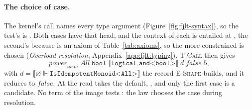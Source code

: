 \paragraph{The choice of case.}
The kernel's call names every type argument (Figure~\ref{fig:fjlt-syntax}), so the test's  is .
Both cases have that head, and the context of each is entailed at , the second's because  is an axiom of Table~\ref{tab:axioms}, so the more constrained is chosen (\emph{Overload resolution}, Appendix~\ref{app:fjlt:typing}).
\textsc{T-Call} then gives
\[ \mathit{power}_{\mathit{idem}}\;\mathit{All}\;\texttt{bool}\;\llbracket \texttt{logical\_and<bool>} \rrbracket\;d\;\mathit{false}\;5, \]
with $d = \llbracket \varnothing \Vdash \texttt{IsIdempotentMonoid<All>} \rrbracket$ the record \textsc{E-Shape} builds, and it reduces to $\mathit{false}$.
At  the read  takes the default, , and only the first case is a candidate.
No term of the image tests : the law chooses the case during resolution.
